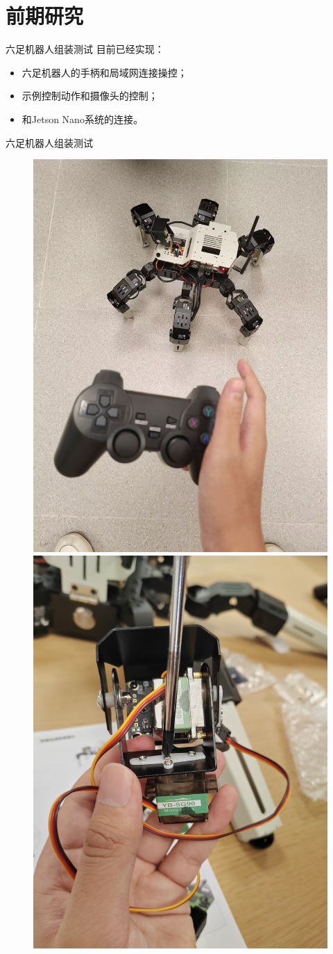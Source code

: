 \documentclass{beamer}
\begin{document}
\section{前期研究}

\begin{frame}{六足机器人组装测试}
    目前已经实现：
    \begin{itemize}
        \item 六足机器人的手柄和局域网连接操控；
        \item 示例控制动作和摄像头的控制；
        \item 和Jetson Nano系统的连接。
    \end{itemize}
\end{frame}

\begin{frame}{六足机器人组装测试}
    \begin{figure}[htpb]
        \centering
        \includegraphics[width=0.49\linewidth]{pic/hex.jpg}
        \includegraphics[width=0.49\linewidth]{pic/constr.jpg}
    \end{figure}
\end{frame}
\end{document}
